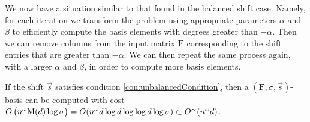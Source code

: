 We now have a situation similar to that found in the balanced shift
case. Namely, for each iteration we transform the problem using appropriate
parameters $\alpha$ and $\beta$ to efficiently compute the basis
elements with degrees greater than $-\alpha$. Then we can remove
columns from the input matrix $\mathbf{F}$ corresponding to the shift
entries that are greater than $-\alpha$. We can then repeat the same
process again, with a larger $\alpha$ and $\beta$, in order to compute
more basis elements. 
\begin{thm}
If the shift $\vec{s}$ satisfies condition \eqref{con:unbalancedCondition},
then a $\left(\mathbf{F},\sigma,\vec{s}\right)$-basis can be computed
with cost $O\left(n^{\omega}\bar{\M}(d)\log\sigma\right)=O(n^{\omega}d\log d\log\log d\log\sigma)\subset O^{\sim}(n^{\omega}d)$. \end{thm}
